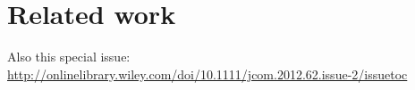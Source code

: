 \section{Related work}

Also this special issue: \url{http://onlinelibrary.wiley.com/doi/10.1111/jcom.2012.62.issue-2/issuetoc}

\citep{mishra_enthusiasm_2014}

